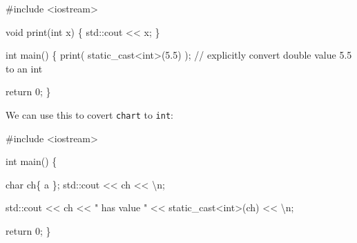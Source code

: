 \documentclass[
  letterpaper,
  DIV=11,
  numbers=noendperiod]{scrreprt}
\newenvironment{Shaded}{\begin{snugshade}}{\end{snugshade}}
\newcommand{\CommentTok}[1]{\textcolor[rgb]{0.37,0.37,0.37}{#1}}
\newcommand{\DecValTok}[1]{\textcolor[rgb]{0.68,0.00,0.00}{#1}}
\newcommand{\ErrorTok}[1]{\textcolor[rgb]{0.68,0.00,0.00}{#1}}
\newcommand{\FloatTok}[1]{\textcolor[rgb]{0.68,0.00,0.00}{#1}}
\newcommand{\FunctionTok}[1]{\textcolor[rgb]{0.28,0.35,0.67}{#1}}
\newcommand{\NormalTok}[1]{\textcolor[rgb]{0.00,0.23,0.31}{#1}}
\newcommand{\SpecialCharTok}[1]{\textcolor[rgb]{0.37,0.37,0.37}{#1}}
\newcommand{\StringTok}[1]{\textcolor[rgb]{0.13,0.47,0.30}{#1}}
\begin{document}
\begin{Shaded}
\begin{Highlighting}[]
\CommentTok{\#include \textless{}iostream\textgreater{}}

\NormalTok{void }\FunctionTok{print}\NormalTok{(int x)}
\NormalTok{\{}
\NormalTok{    std}\SpecialCharTok{::}\NormalTok{cout }\SpecialCharTok{\textless{}}\ErrorTok{\textless{}}\NormalTok{ x;}
\NormalTok{\}}

\NormalTok{int }\FunctionTok{main}\NormalTok{()}
\NormalTok{\{}
    \FunctionTok{print}\NormalTok{( static\_cast}\SpecialCharTok{\textless{}}\NormalTok{int}\SpecialCharTok{\textgreater{}}\NormalTok{(}\FloatTok{5.5}\NormalTok{) ); }\SpecialCharTok{/}\ErrorTok{/}\NormalTok{ explicitly convert double value }\FloatTok{5.5}\NormalTok{ to an int}

\NormalTok{    return }\DecValTok{0}\NormalTok{;}
\NormalTok{\}}
\end{Highlighting}
\end{Shaded}

We can use this to covert \texttt{chart} to \texttt{int}:

\begin{Shaded}
\begin{Highlighting}[]
\CommentTok{\#include \textless{}iostream\textgreater{}}

\NormalTok{int }\FunctionTok{main}\NormalTok{() \{}
    
\NormalTok{    char ch\{ }\StringTok{\textquotesingle{}a\textquotesingle{}}\NormalTok{ \};}
\NormalTok{    std}\SpecialCharTok{::}\NormalTok{cout }\SpecialCharTok{\textless{}}\ErrorTok{\textless{}}\NormalTok{ ch }\SpecialCharTok{\textless{}}\ErrorTok{\textless{}} \StringTok{\textquotesingle{}}\SpecialCharTok{\textbackslash{}n}\StringTok{\textquotesingle{}}\NormalTok{;}

\NormalTok{    std}\SpecialCharTok{::}\NormalTok{cout }\SpecialCharTok{\textless{}}\ErrorTok{\textless{}}\NormalTok{ ch }\SpecialCharTok{\textless{}}\ErrorTok{\textless{}} \StringTok{" has value "} \SpecialCharTok{\textless{}}\ErrorTok{\textless{}}\NormalTok{ static\_cast}\SpecialCharTok{\textless{}}\NormalTok{int}\SpecialCharTok{\textgreater{}}\NormalTok{(ch) }\SpecialCharTok{\textless{}}\ErrorTok{\textless{}} \StringTok{\textquotesingle{}}\SpecialCharTok{\textbackslash{}n}\StringTok{\textquotesingle{}}\NormalTok{;}

\NormalTok{    return }\DecValTok{0}\NormalTok{;}
\NormalTok{\}}
\end{Highlighting}
\end{Shaded}
\end{document}
